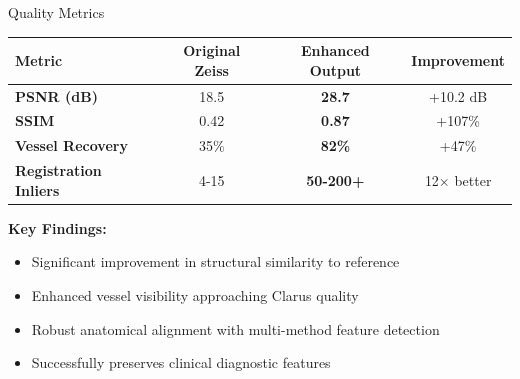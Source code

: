 \documentclass[aspectratio=169]{beamer}
\begin{document}
\begin{frame}{Quality Metrics}
\begin{table}
\centering
\renewcommand{\arraystretch}{1.4}
\begin{tabular}{|l|c|c|c|}
\hline
\textbf{Metric} & \textbf{Original Zeiss} & \textbf{Enhanced Output} & \textbf{Improvement} \\
\hline\hline
\textbf{PSNR (dB)} & 18.5 & \textcolor{green!50!black}{\textbf{28.7}} & \textcolor{green!50!black}{+10.2 dB} \\
\hline
\textbf{SSIM} & 0.42 & \textcolor{green!50!black}{\textbf{0.87}} & \textcolor{green!50!black}{+107\%} \\
\hline
\textbf{Vessel Recovery} & 35\% & \textcolor{green!50!black}{\textbf{82\%}} & \textcolor{green!50!black}{+47\%} \\
\hline
\textbf{Registration Inliers} & 4-15 & \textcolor{green!50!black}{\textbf{50-200+}} & \textcolor{green!50!black}{12× better} \\
\hline
\end{tabular}
\end{table}

\vspace{0.5cm}

\textbf{Key Findings:}
\begin{itemize}
    \item Significant improvement in structural similarity to reference
    \item Enhanced vessel visibility approaching Clarus quality
    \item Robust anatomical alignment with multi-method feature detection
    \item Successfully preserves clinical diagnostic features
\end{itemize}
\end{frame}
\end{document}
